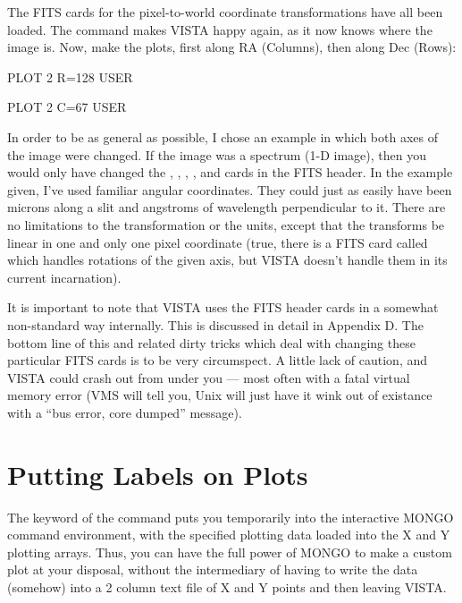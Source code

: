 The FITS cards for the pixel-to-world coordinate transformations have all been
loaded.  The command  makes VISTA happy again, as it now knows
where the image is.  Now, make the plots, first along RA (Columns), then along
Dec (Rows):

\begin{command}
      \item PLOT 2 R=128 USER
      \item PLOT 2 C=67 USER
\end{command}

In order to be as general as possible, I chose an example in which both axes
of the image were changed.  If the image was a spectrum (1-D image), then you
would only have changed the , , ,
, and  cards in the FITS header. In the example
given, I've used familiar angular coordinates.  They could just as easily have
been microns along a slit and angstroms of wavelength perpendicular to it.
There are no limitations to the transformation or the units, except that the
transforms be linear in one and only one pixel coordinate (true, there is a
FITS card called  which handles rotations of the given axis, but
VISTA doesn't handle them in its current incarnation).

It is important to note that VISTA uses the FITS header cards in a somewhat
non-standard way internally.  This is discussed in detail in Appendix D.  The
bottom line of this and related dirty tricks which deal with changing these
particular FITS cards is to be very circumspect.  A little lack of caution,
and VISTA could crash out from under you --- most often with a fatal virtual
memory error (VMS will tell you, Unix will just have it wink out of existance
with a ``bus error, core dumped'' message).


\section{Putting Labels on Plots}

The  keyword of the  command puts you temporarily into
the interactive MONGO command environment, with the specified plotting data
loaded into the X and Y plotting arrays.  Thus, you can have the full power of
MONGO to make a custom plot at your disposal, without the intermediary of
having to write the data (somehow) into a 2 column text file of X and Y points
and then leaving VISTA.

